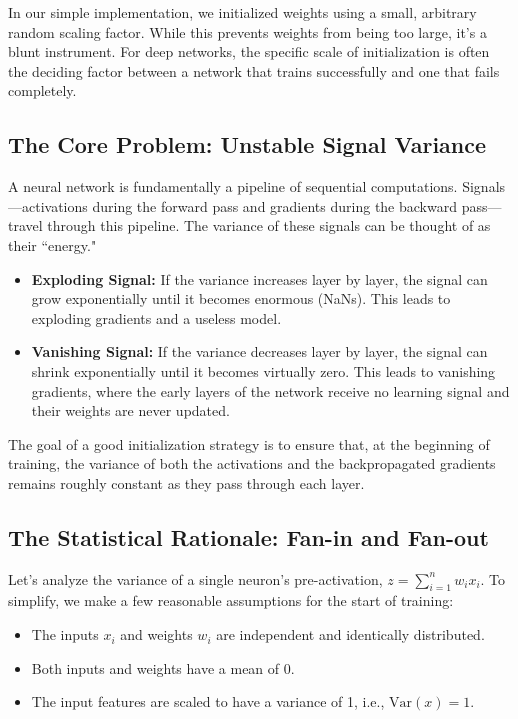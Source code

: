 \documentclass{article}
\begin{document}
In our simple implementation, we initialized weights using a small, arbitrary random scaling factor. While this prevents weights from being too large, it's a blunt instrument. 
For deep networks, the specific scale of initialization is often the deciding factor between a network that trains successfully and one that fails completely.

\subsection{The Core Problem: Unstable Signal Variance}

A neural network is fundamentally a pipeline of sequential computations. Signals—activations during the forward pass and gradients during the backward pass—travel through this pipeline. The variance of these signals can be thought of as their ``energy."

\begin{itemize}
    \item \textbf{Exploding Signal:} If the variance increases layer by layer, the signal can grow exponentially until it becomes enormous (NaNs). This leads to exploding gradients and a useless model.
    \item \textbf{Vanishing Signal:} If the variance decreases layer by layer, the signal can shrink exponentially until it becomes virtually zero. This leads to vanishing gradients, where the early layers of the network receive no learning signal and their weights are never updated.
\end{itemize}

The goal of a good initialization strategy is to ensure that, at the beginning of training, the variance of both the activations and the backpropagated gradients remains roughly constant as they pass through each layer.

\subsection{The Statistical Rationale: Fan-in and Fan-out}

Let's analyze the variance of a single neuron's pre-activation, $z = \sum_{i=1}^{n} w_i x_i$. To simplify, we make a few reasonable assumptions for the start of training:
\begin{itemize}
    \item The inputs $x_i$ and weights $w_i$ are independent and identically distributed.
    \item Both inputs and weights have a mean of 0.
    \item The input features are scaled to have a variance of 1, i.e., $\text{Var}(x) = 1$.
\end{itemize}
\end{document}
